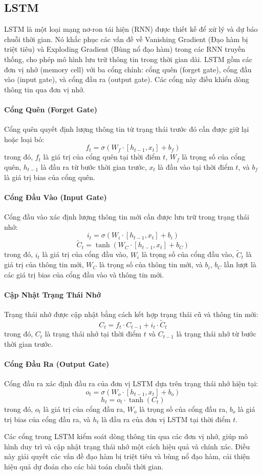 \subsection{LSTM}

LSTM là một loại mạng nơ-ron tái hiện (RNN) được thiết kế để xử lý và dự báo chuỗi thời gian. Nó khắc phục các vấn đề về Vanishing Gradient (Đạo hàm bị triệt tiêu) và Exploding Gradient (Bùng nổ đạo hàm) trong các RNN truyền thống, cho phép mô hình lưu trữ thông tin trong thời gian dài. LSTM gồm các đơn vị nhớ (memory cell) với ba cổng chính: cổng quên (forget gate), cổng đầu vào (input gate), và cổng đầu ra (output gate). Các cổng này điều khiển dòng thông tin qua đơn vị nhớ.

\paragraph{Cổng Quên (Forget Gate)}
Cổng quên quyết định lượng thông tin từ trạng thái trước đó cần được giữ lại hoặc loại bỏ:
\[
f_t = \sigma(W_f \cdot [h_{t-1}, x_t] + b_f)
\]
trong đó, \(f_t\) là giá trị của cổng quên tại thời điểm \(t\), \(W_f\) là trọng số của cổng quên, \(h_{t-1}\) là đầu ra từ bước thời gian trước, \(x_t\) là đầu vào tại thời điểm \(t\), và \(b_f\) là giá trị bias của cổng quên.

\paragraph{Cổng Đầu Vào (Input Gate)}
Cổng đầu vào xác định lượng thông tin mới cần được lưu trữ trong trạng thái nhớ:
\[
i_t = \sigma(W_i \cdot [h_{t-1}, x_t] + b_i)
\]
\[
\tilde{C}_t = \tanh(W_C \cdot [h_{t-1}, x_t] + b_C)
\]
trong đó, \(i_t\) là giá trị của cổng đầu vào, \(W_i\) là trọng số của cổng đầu vào, \(\tilde{C}_t\) là giá trị của thông tin mới, \(W_C\) là trọng số của thông tin mới, và \(b_i\), \(b_C\) lần lượt là các giá trị bias của cổng đầu vào và thông tin mới.

\paragraph{Cập Nhật Trạng Thái Nhớ}
Trạng thái nhớ được cập nhật bằng cách kết hợp trạng thái cũ và thông tin mới:
\[
C_t = f_t \cdot C_{t-1} + i_t \cdot \tilde{C}_t
\]
trong đó, \(C_t\) là trạng thái nhớ tại thời điểm \(t\) và \(C_{t-1}\) là trạng thái nhớ từ bước thời gian trước.

\paragraph{Cổng Đầu Ra (Output Gate)}
Cổng đầu ra xác định đầu ra của đơn vị LSTM dựa trên trạng thái nhớ hiện tại:
\[
o_t = \sigma(W_o \cdot [h_{t-1}, x_t] + b_o)
\]
\[
h_t = o_t \cdot \tanh(C_t)
\]
trong đó, \(o_t\) là giá trị của cổng đầu ra, \(W_o\) là trọng số của cổng đầu ra, \(b_o\) là giá trị bias của cổng đầu ra, và \(h_t\) là đầu ra của đơn vị LSTM tại thời điểm \(t\).

Các cổng trong LSTM kiểm soát dòng thông tin qua các đơn vị nhớ, giúp mô hình duy trì và cập nhật trạng thái nhớ một cách hiệu quả và chính xác. Điều này giải quyết các vấn đề đạo hàm bị triệt tiêu và bùng nổ đạo hàm, cải thiện hiệu quả dự đoán cho các bài toán chuỗi thời gian.